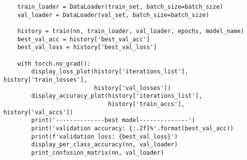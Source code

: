 \begin{verbatim}
    train_loader = DataLoader(train_set, batch_size=batch_size)
    val_loader = DataLoader(val_set, batch_size=batch_size)

    history = train(nn, train_loader, val_loader, epochs, model_name)
    best_val_acc = history['best_val_acc']
    best_val_loss = history['best_val_loss']

    with torch.no_grad():
        display_loss_plot(history['iterations_list'], history['train_losses'],
                          history['val_losses'])
        display_accuracy_plot(history['iterations_list'],
                              history['train_accs'], history['val_accs'])
        print('--------------best model--------------')
        print('validation accuracy: {:.2f}%'.format(best_val_acc))
        print(f'validation loss: {best_val_loss}')
        display_per_class_accuracy(nn, val_loader)
        print_confusion_matrix(nn, val_loader)
    \end{verbatim}